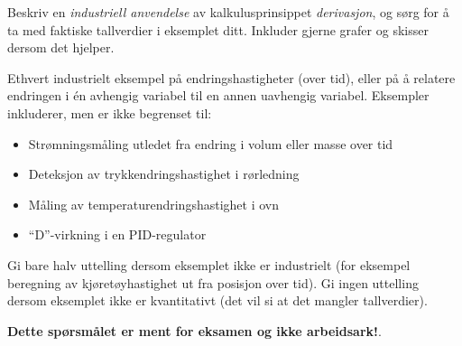 

Beskriv en {\it industriell anvendelse} av kalkulusprinsippet {\it derivasjon}, og sørg for å ta med faktiske tallverdier i eksemplet ditt. Inkluder gjerne grafer og skisser dersom det hjelper.

\vskip 100pt







Ethvert industrielt eksempel på endringshastigheter (over tid), eller på å relatere endringen i én avhengig variabel til en annen uavhengig variabel. Eksempler inkluderer, men er ikke begrenset til:

\begin{itemize}
\item{} Strømningsmåling utledet fra endring i volum eller masse over tid
\item{} Deteksjon av trykkendringshastighet i rørledning
\item{} Måling av temperaturendringshastighet i ovn
\item{} ``D''-virkning i en PID-regulator
\end{itemize}

Gi bare halv uttelling dersom eksemplet ikke er industrielt (for eksempel beregning av kjøretøyhastighet ut fra posisjon over tid). Gi ingen uttelling dersom eksemplet ikke er kvantitativt (det vil si at det mangler tallverdier).







{\bf Dette spørsmålet er ment for eksamen og ikke arbeidsark!}.


